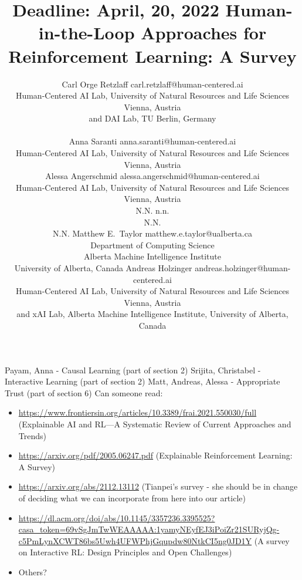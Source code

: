 \documentclass[twoside,11pt]{article}
\begin{document}
\title{Deadline: April, 20, 2022 Human-in-the-Loop Approaches for Reinforcement Learning: A Survey}

\author{\name Carl Orge Retzlaff \email carl.retzlaff@human-centered.ai\\ 
\addr Human-Centered AI Lab, University of Natural Resources and Life Sciences Vienna, Austria\\
and DAI Lab, TU Berlin, Germany\\ \\
\AND
\name Anna Saranti \email anna.saranti@human-centered.ai \\
\addr Human-Centered AI Lab, University of Natural Resources and Life Sciences Vienna, Austria\\
\AND
\name Alessa Angerschmid \email alessa.angerschmid@human-centered.ai \\
\addr Human-Centered AI Lab, University of Natural Resources and Life Sciences Vienna, Austria\\
\AND
\name N.N. \email n.n. \\
\addr N.N. \\ N.N.
\AND
\name Matthew E.~Taylor \email matthew.e.taylor@ualberta.ca \\
\addr Department of Computing Science\\
Alberta Machine Intelligence Institute\\
University of Alberta, Canada
\AND
\name Andreas Holzinger \email andreas.holzinger@human-centered.ai \\
\addr Human-Centered AI Lab, University of Natural Resources and Life Sciences Vienna, Austria \\
and xAI Lab, Alberta Machine Intelligence Institute, University of Alberta, Canada
}


\maketitle



Payam, Anna - Causal Learning (part of section 2)
Srijita, Christabel - Interactive Learning (part of section 2)
Matt, Andreas, Alessa - Appropriate Trust (part of section 6)
Can someone read: 
\begin{itemize}
\item \url{https://www.frontiersin.org/articles/10.3389/frai.2021.550030/full} (Explainable AI and RL—A Systematic Review of Current Approaches and Trends)
\item \url{https://arxiv.org/pdf/2005.06247.pdf} (Explainable Reinforcement Learning: A Survey)
\item \url{https://arxiv.org/abs/2112.13112} (Tianpei's survey - she should be in change of deciding what we can incorporate from here into our article)
\item \url{https://dl.acm.org/doi/abs/10.1145/3357236.3395525?casa_token=69vSgJmTwWEAAAAA:1yamyNEyfEJ3iPoiZr21SURyjQg-c5PmLynXCWT86bs5Uwh4UFWPhjGqupdw80NtkCI5ng0JD1Y} (A survey on Interactive RL: Design Principles and Open Challenges)
\item Others?
\end{itemize}
\end{document}
